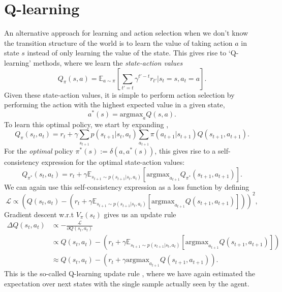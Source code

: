 \section{Q-learning}
\label{sec:q_learning}

An alternative approach for learning and action selection when we don't know the transition structure of the world is to learn the value of taking action $a$ in state $s$ instead of only learning the value of the state.
This gives rise to `Q-learning' methods, where we learn the \emph{state-action values}
\begin{equation}
    \label{eq:Q-values}
    Q_\pi(s,a) =  \mathbb{E}_{a \sim \pi} \left [ \sum_{t'=t} \gamma^{t' - t} r_{t'} | s_{t} = s, a_{t} = a \right ].
\end{equation}
Given these state-action values, it is simple to perform action selection by performing the action with the highest expected value in a given state,
\begin{equation}
    a^*(s) = \text{argmax}_{a} Q(s, a).
\end{equation}
To learn this optimal policy, we start by expanding ,
\begin{equation}
    \label{eq:Q-expanded}
    Q_\pi(s_t,a_t) =  r_t + \gamma \sum_{s_{t+1}} p(s_{t+1} | s_t, a_t) \sum_{a_{t+1}} \pi(a_{t+1} | s_{t+1}) Q(s_{t+1}, a_{t+1}).
\end{equation}
For the \emph{optimal} policy $\pi^*(s) := \delta(a, a^*(s))$, this gives rise to a self-consistency expression for the optimal state-action values:
\begin{equation}
    \label{eq:Q-optimal}
    Q_{\pi^*}(s_t,a_t) =  r_t + \gamma \mathbb{E}_{s_{t+1} \sim p(s_{t+1} | s_t, a_t)} \left [ \text{argmax}_{a_{t+1}} Q_{\pi^*}(s_{t+1}, a_{t+1}) \right ].
\end{equation}
We can again use this self-consistency expression as a loss function by defining
\begin{equation}
    \mathcal{L} \propto \left (  Q(s_t,a_t) - (r_t + \gamma \mathbb{E}_{s_{t+1} \sim p(s_{t+1} | s_t, a_t)} \left [ \text{argmax}_{a_{t+1}} Q(s_{t+1}, a_{t+1}) \right ] ) \right )^2,
\end{equation}
Gradient descent w.r.t $V_\pi(s_t)$ gives us an update rule
\begin{align}
    \Delta  Q(s_t,a_t) & \propto - \frac{\mathcal{L}}{\partial  Q(s_t,a_t)}\\
    &\propto Q(s_t,a_t) - (r_t + \gamma \mathbb{E}_{s_{t+1} \sim p(s_{t+1} | s_t, a_t)} \left [ \text{argmax}_{a_{t+1}} Q(s_{t+1}, a_{t+1}) \right ] )\\
    &\approx Q(s_t,a_t) - (r_t + \gamma \text{argmax}_{a_{t+1}} Q(s_{t+1}, a_{t+1})).
\end{align}
This is the so-called Q-learning update rule \citep{watkins1989learning}, where we have again estimated the expectation over next states with the single sample actually seen by the agent.

